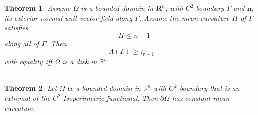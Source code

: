 \documentclass[oneside]{book}
\newtheorem{theorem}{Theorem}[section]
\begin{document}
		
		
		
		
		
		\hfill \break
		
		\begin{theorem}
			\label{t:5}
			Assume $\Omega$ is a bounded domain in $\mathbf{R}^{n}$, with $C^{2}$ boundary $\Gamma$
			and $\mathbf{n}$, its exterior normal unit vector field along $\Gamma$. Assume the mean curvature
			$H$ of $\Gamma$ satisfies
			$$
			-H \leq n-1
			$$
			along all of $\Gamma$. Then
			$$
			A(\Gamma) \geq \mathfrak{c}_{\mathfrak{n}-1}
			$$
			with equality iff $\Omega$ is a disk in $\mathbb{R}^{n}$ \\\\
		\end{theorem}
		
		
		
		
		
		\begin{theorem}
			\label{t:5.5}
			Let $\Omega$ be a bounded domain in $\mathbb{R}^{n}$ with $C^{2}$ boundary that is an extremal of the $C^{2}$ Isoperimetric functional. Then  $\partial \Omega$ has constant mean curvature.
		\end{theorem}
		
\end{document}
